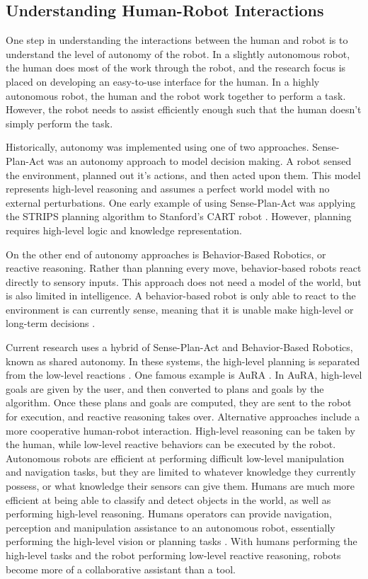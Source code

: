 \documentclass{article}
\begin{document}
\subsection{Understanding Human-Robot Interactions}
One step in understanding the interactions between the human and robot is to understand the level of autonomy of the robot. In a slightly autonomous robot, the human does most of the work through the robot, and the research focus is placed on developing an easy-to-use interface for the human. In a highly autonomous robot, the human and the robot work together to perform a task. However, the robot needs to assist efficiently enough such that the human doesn't simply perform the task.

Historically, autonomy was implemented using one of two approaches. Sense-Plan-Act was an autonomy approach to model decision making. A robot sensed the environment, planned out it's actions, and then acted upon them. This model represents high-level reasoning and assumes a perfect world model with no external perturbations. One early example of using Sense-Plan-Act was applying the STRIPS \cite{journals/ai/Fikes93} planning algorithm to Stanford's CART robot \cite{1456952}. However, planning requires high-level logic and knowledge representation.

On the other end of autonomy approaches is Behavior-Based Robotics, or reactive reasoning. Rather than planning every move, behavior-based robots react directly to sensory inputs. This approach does not need a model of the world, but is also limited in intelligence. A behavior-based robot is only able to react to the environment is can currently sense,  meaning that it is unable make high-level or long-term decisions \cite{Arkin:1998:BR:521898}.

Current research uses a hybrid of Sense-Plan-Act and Behavior-Based Robotics, known as shared autonomy. In these systems, the high-level planning is separated from the low-level reactions \cite{Bonasso95experienceswith}. One famous example is AuRA \cite{Arkin97aura:principles}. In AuRA, high-level goals are given by the user, and then converted to plans and goals by the algorithm. Once these plans and goals are computed, they are sent to the robot for execution, and reactive reasoning takes over. Alternative approaches include a more cooperative human-robot interaction. High-level reasoning can be taken by the human, while low-level reactive behaviors can be executed by the robot. Autonomous robots are efficient at performing difficult low-level manipulation and navigation tasks, but they are limited to whatever knowledge they currently possess, or what knowledge their sensors can give them. Humans are much more efficient at being able to classify and detect objects in the world, as well as performing high-level reasoning. Humans operators can provide navigation, perception and manipulation assistance to an autonomous robot, essentially performing the high-level vision or planning tasks \cite{6281248, 4415256, Goodfellow:2010:HMH:1734454.1734536, 5980259}. With humans performing the high-level tasks and the robot performing low-level reactive reasoning, robots become more of a collaborative assistant than a tool.
\end{document}

